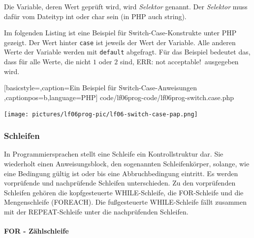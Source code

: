 Die Variable, deren Wert geprüft wird, wird {\it Selektor} genannt. Der {\it Selektor} muss dafür vom Dateityp int oder char sein (in PHP auch string).

Im folgenden Listing ist eine Beispiel für Switch-Case-Konstrukte unter PHP gezeigt. Der Wert hinter \texttt{case} ist jeweils der Wert der Variable. Alle anderen Werte der Variable werden mit \texttt{default} abgefragt. Für das Beispiel bedeutet das, dass für alle Werte, die nicht $1$ oder $2$ sind, \ql ERR: not acceptable!\qr\ ausgegeben wird.


	[basicstyle=\small,caption={Ein Beispiel für Switch-Case-Anweisungen}
	\label{lst:Switch-Case},captionpos=b,language=PHP]
	{code/lf06prog-code/lf06prog-switch.case.php}
	
\texttt{[image: pictures/lf06prog-pic/lf06-switch-case-pap.png]}

\subsubsection{Schleifen}

In Programmiersprachen stellt eine Schleife ein Kontrollstruktur dar. Sie wiederholt einen Anweisungsblock, den sogenannten Schleifenkörper, solange, wie eine Bedingung gültig ist oder bis eine Abbruchbedingung eintritt. Es werden vorprüfende und nachprüfende Schleifen unterschieden. Zu den vorprüfenden Schleifen gehören die kopfgesteuerte WHILE-Schleife, die FOR-Schleife und die Mengenschleife (FOREACH). Die fußgesteuerte WHILE-Schleife fällt zusammen mit der REPEAT-Schleife unter die nachprüfenden Schleifen.

\paragraph{FOR - Zählschleife}~\\

